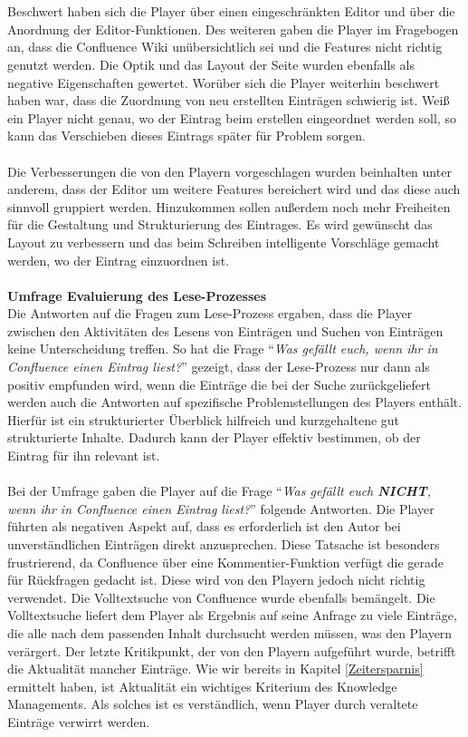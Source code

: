 \documentclass[a4paper,12pt]{scrartcl}
\begin{document}
\\\\
Beschwert haben sich die Player über einen eingeschränkten Editor und über die Anordnung der Editor-Funktionen. Des weiteren gaben die Player im Fragebogen an, dass die Confluence Wiki unübersichtlich sei und die Features nicht richtig genutzt werden. Die Optik und das Layout der Seite wurden ebenfalls als negative Eigenschaften gewertet. Worüber sich die Player weiterhin beschwert haben war, dass die Zuordnung von neu erstellten Einträgen schwierig ist. Weiß ein Player nicht genau, wo der Eintrag beim erstellen eingeordnet werden soll, so kann das Verschieben dieses Eintrags später für Problem sorgen.
\\\\
Die Verbesserungen die von den Playern vorgeschlagen wurden beinhalten unter anderem, dass der Editor um weitere Features bereichert wird und das diese auch sinnvoll gruppiert werden. Hinzukommen sollen außerdem noch mehr Freiheiten für die Gestaltung und Strukturierung des Eintrages. Es wird gewünscht das Layout zu verbessern und das beim Schreiben intelligente Vorschläge gemacht werden, wo der Eintrag einzuordnen ist.
\\\\
\textbf{Umfrage Evaluierung des Lese-Prozesses}\\
Die Antworten auf die Fragen zum Lese-Prozess ergaben, dass die Player zwischen den Aktivitäten des Lesens von Einträgen und Suchen von Einträgen keine Unterscheidung treffen. So hat die Frage \enquote{\textit{Was gefällt euch, wenn ihr in Confluence einen Eintrag liest?}} gezeigt, dass der Lese-Prozess nur dann als positiv empfunden wird, wenn die Einträge die bei der Suche zurückgeliefert werden auch die Antworten auf spezifische Problemstellungen des Players enthält. Hierfür ist ein strukturierter Überblick hilfreich und kurzgehaltene gut strukturierte Inhalte. Dadurch kann der Player effektiv bestimmen, ob der Eintrag für ihn relevant ist. 
\\\\
Bei der Umfrage gaben die Player auf die Frage \enquote{\textit{Was gefällt euch \textbf{NICHT}, wenn ihr in Confluence einen Eintrag liest?}} folgende Antworten. Die Player führten als negativen Aspekt auf, dass es erforderlich ist den Autor bei unverständlichen Einträgen direkt anzusprechen. Diese Tatsache ist besonders frustrierend, da Confluence über eine Kommentier-Funktion verfügt die gerade für Rückfragen gedacht ist. Diese wird von den Playern jedoch nicht richtig verwendet. Die Volltextsuche von Confluence wurde ebenfalls bemängelt. Die Volltextsuche liefert dem Player als Ergebnis auf seine Anfrage zu viele Einträge, die alle nach dem passenden Inhalt durchsucht werden müssen, was den Playern verärgert. Der letzte Kritikpunkt, der von den Playern aufgeführt wurde, betrifft die Aktualität mancher Einträge. Wie wir bereits in Kapitel \ref{Zeitersparnis} ermittelt haben, ist Aktualität ein wichtiges Kriterium des Knowledge Managements. Als solches ist es verständlich, wenn Player durch veraltete Einträge verwirrt werden.
\end{document}
